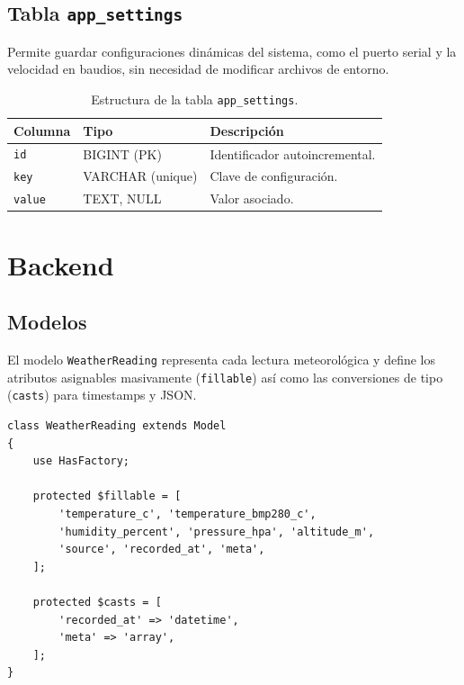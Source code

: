 \documentclass[12pt,a4paper]{report}
\begin{document}
\subsection{Tabla \texttt{app\_settings}}
\label{subsec:tabla-settings}

Permite guardar configuraciones dinámicas del sistema, como el puerto serial y la velocidad en baudios, sin necesidad de modificar archivos de entorno.

\begin{table}[H]
\centering
\caption{Estructura de la tabla \texttt{app\_settings}.}
\label{tab:app-settings}
\begin{tabular}{@{}llp{6cm}@{}}
\toprule
\textbf{Columna} & \textbf{Tipo} & \textbf{Descripción} \\
\midrule
\texttt{id} & BIGINT (PK) & Identificador autoincremental. \\
\texttt{key} & VARCHAR (unique) & Clave de configuración. \\
\texttt{value} & TEXT, NULL & Valor asociado. \\
\bottomrule
\end{tabular}
\end{table}

\section{Backend}
\label{sec:backend}

\subsection{Modelos}
\label{subsec:modelos}

El modelo \texttt{WeatherReading} representa cada lectura meteorológica y define los atributos asignables masivamente (\texttt{fillable}) así como las conversiones de tipo (\texttt{casts}) para timestamps y JSON.

\begin{lstlisting}[caption={Modelo WeatherReading.}]
class WeatherReading extends Model
{
    use HasFactory;

    protected $fillable = [
        'temperature_c', 'temperature_bmp280_c',
        'humidity_percent', 'pressure_hpa', 'altitude_m',
        'source', 'recorded_at', 'meta',
    ];

    protected $casts = [
        'recorded_at' => 'datetime',
        'meta' => 'array',
    ];
}
\end{lstlisting}
\end{document}
